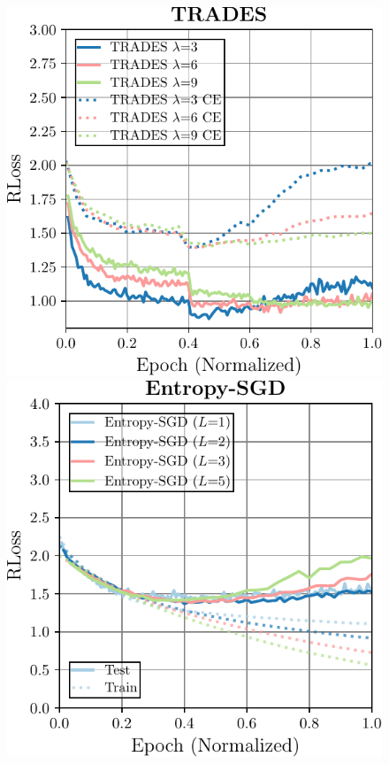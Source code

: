 \begin{figure}[t]
\begin{minipage}[t]{0.23\textwidth}
	\end{minipage}
	\begin{minipage}[t]{0.23\textwidth}
		\includegraphics[width=\textwidth]{plots_supp_understanding_ablation_trades}
	\end{minipage}
	\begin{minipage}[t]{0.23\textwidth}
		\includegraphics[width=\textwidth]{plots_supp_understanding_ablation_esgd}

\end{minipage}
\end{figure}
